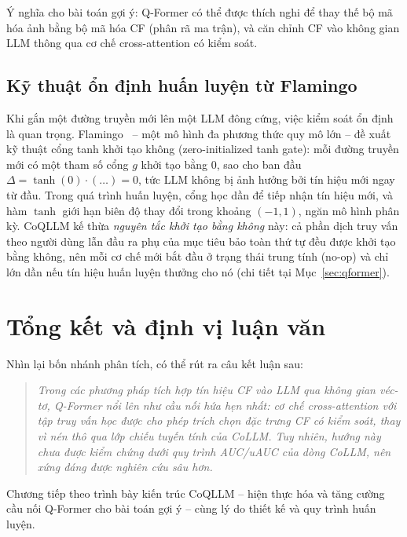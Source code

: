 Ý nghĩa cho bài toán gợi ý: Q-Former có thể được thích nghi để thay thế bộ mã hóa ảnh
bằng bộ mã hóa CF (phân rã ma trận), và căn chỉnh CF vào không gian LLM thông
qua cơ chế cross-attention có kiểm soát.

\subsection{Kỹ thuật ổn định huấn luyện từ Flamingo}
\label{ssec:flamingo}

Khi gắn một đường truyền mới lên một LLM đông cứng, việc kiểm soát ổn định là quan
trọng. Flamingo~\cite{flamingo2022} -- một mô hình đa phương thức quy mô lớn -- đề xuất
kỹ thuật cổng tanh khởi tạo không (zero-initialized tanh gate): mỗi đường truyền mới có
một tham số cổng $g$ khởi tạo bằng $0$, sao cho ban đầu $\Delta = \tanh(0) \cdot (\ldots)
= 0$, tức LLM không bị ảnh hưởng bởi tín hiệu mới ngay từ đầu. Trong quá trình huấn
luyện, cổng học dần để tiếp nhận tín hiệu mới, và hàm $\tanh$ giới hạn biên độ thay đổi
trong khoảng $(-1, 1)$, ngăn mô hình phân kỳ. CoQLLM kế thừa \textit{nguyên tắc khởi tạo
bằng không} này: cả phần dịch truy vấn theo người dùng lẫn đầu ra phụ của mục tiêu bảo
toàn thứ tự đều được khởi tạo bằng không, nên mỗi cơ chế mới bắt đầu ở trạng thái trung
tính (no-op) và chỉ lớn dần nếu tín hiệu huấn luyện thưởng cho nó (chi tiết tại
Mục~\ref{sec:qformer}).

\section{Tổng kết và định vị luận văn}
\label{sec:tong-ket-ch2}

Nhìn lại bốn nhánh phân tích, có thể rút ra câu kết luận sau:

\begin{quote}
\textit{Trong các phương pháp tích hợp tín hiệu CF vào LLM qua không gian véc-tơ,
Q-Former nổi lên như cầu nối hứa hẹn nhất: cơ chế cross-attention với tập truy vấn học
được cho phép trích chọn đặc trưng CF có kiểm soát, thay vì nén thô qua lớp chiếu
tuyến tính của CoLLM. Tuy nhiên, hướng này chưa được kiểm chứng dưới quy trình AUC/uAUC
của dòng CoLLM, nên xứng đáng được nghiên cứu sâu hơn.}
\end{quote}

Chương tiếp theo trình bày kiến trúc CoQLLM -- hiện thực hóa và tăng cường cầu nối
Q-Former cho bài toán gợi ý -- cùng lý do thiết kế và quy trình huấn luyện.
